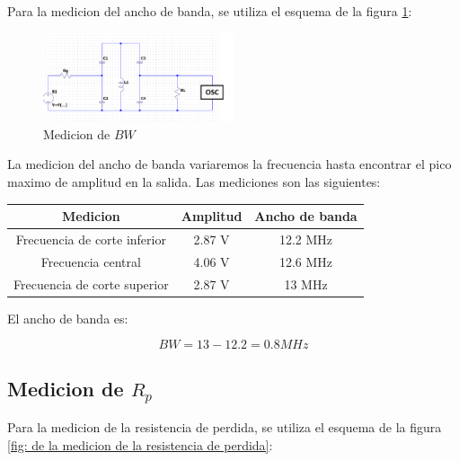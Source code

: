 Para la medicion del ancho de banda, se utiliza el esquema de la figura \ref{fig: de la medicion del ancho de banda}:

\begin{figure}[h]
    \centering
    \includegraphics[width=0.5\textwidth]{Imagenes/medicion_bw.png}
    \caption{Medicion de $BW$}
    \label{fig: de la medicion del ancho de banda}
\end{figure}

La medicion del ancho de banda variaremos la frecuencia hasta encontrar el pico maximo de amplitud en la salida. Las mediciones son las siguientes:

\begin{table}[h]
    \centering
    \begin{tabular}{|c|c|c|}
    \hline
    \rowcolor[HTML]{C0C0C0} 
    \textbf{Medicion} & \textbf{Amplitud} & \textbf{Ancho de banda} \\ \hline
    Frecuencia de corte inferior            & 2.87 V             & 12.2 MHz                \\ \hline
    Frecuencia central         & 4.06 V             & 12.6 MHz                \\ \hline
    Frecuencia de corte superior            & 2.87 V             & 13 MHz                \\ \hline
    \end{tabular}
\end{table}

El ancho de banda es:

\begin{equation}
    BW = 13 - 12.2 = 0.8 MHz
\end{equation}

\subsection{Medicion de $R_p$}

Para la medicion de la resistencia de perdida, se utiliza el esquema de la figura \ref{fig: de la medicion de la resistencia de perdida}:

